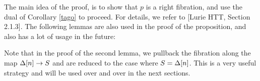 
The main idea of the proof, is to show that $p$ is a right fibration, and use the dual of Corollary \ref{tago} to proceed.
For details, we refer to [Lurie HTT, Section 2.1.3]. The following lemmas are also used in the proof of the proposition,
and also has a lot of usage in the future:



Note that in the proof of the second lemma, we pullback the fibration along the map $\Delta[n]\to S$ and are reduced
to the case where $S=\Delta[n]$. This is a very useful strategy and will be used over and over in the next sections.